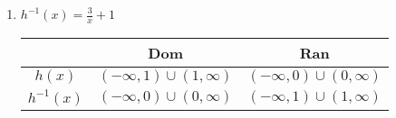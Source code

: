 \begin{enumerate}
\item $h^{-1}(x) = \frac{3}{x} + 1$ \newline\\
    \setlength{\extrarowheight}{5pt}
    \begin{tabular}{c|c|c}
            &   Dom &   Ran \\  \hline
        $h(x)$  &   $(-\infty, 1) \cup (1, \infty)$  &   $(-\infty, 0) \cup (0, \infty)$    \\[5pt]  \hline
        $h^{-1}(x)$ &   $(-\infty, 0) \cup (0, \infty)$   &   $(-\infty, 1) \cup (1, \infty)$  \\
    \end{tabular}


\end{enumerate}